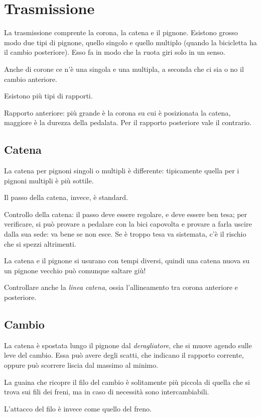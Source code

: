 \chapter{Trasmissione}
La trasmissione comprente la corona, la catena e il pignone.
Esistono grosso modo due tipi di pignone, quello singolo e quello multiplo (quando la bicicletta ha il cambio posteriore).
Esso fa in modo che la ruota giri solo in un senso.

Anche di corone ce n'è una singola e una multipla, a seconda che ci sia o no il cambio anteriore.

Esistono più tipi di rapporti.

Rapporto anteriore: più grande è la corona su cui è posizionata la catena, maggiore è la durezza della pedalata.
Per il rapporto posteriore vale il contrario.

\section{Catena}
La catena per pignoni singoli o multipli è differente: tipicamente quella per i pignoni multipli è più sottile.

Il passo della catena, invece, è standard.

Controllo della catena: il passo deve essere regolare, e deve essere ben tesa; per verificare, si può provare a pedalare con la bici capovolta e provare a farla uscire dalla sua sede: va bene se non esce.
Se è troppo tesa va sistemata, c'è il rischio che si spezzi altrimenti.

La catena e il pignone si usurano con tempi diversi, quindi una catena nuova su un pignone vecchio può comunque saltare giù!

Controllare anche la \emph{linea catena}, ossia l'allineamento tra corona anteriore e posteriore.

\section{Cambio}
La catena è spostata lungo il pignone dal \emph{deragliatore}, che si muove agendo sulle leve del cambio.
Essa può avere degli scatti, che indicano il rapporto corrente, oppure può scorrere liscia dal massimo al minimo.

La guaina che ricopre il filo del cambio è solitamente più piccola di quella che si trova sui fili dei freni, ma in caso di necessità sono intercambiabili.

L'attacco del filo è invece come quello del freno.

